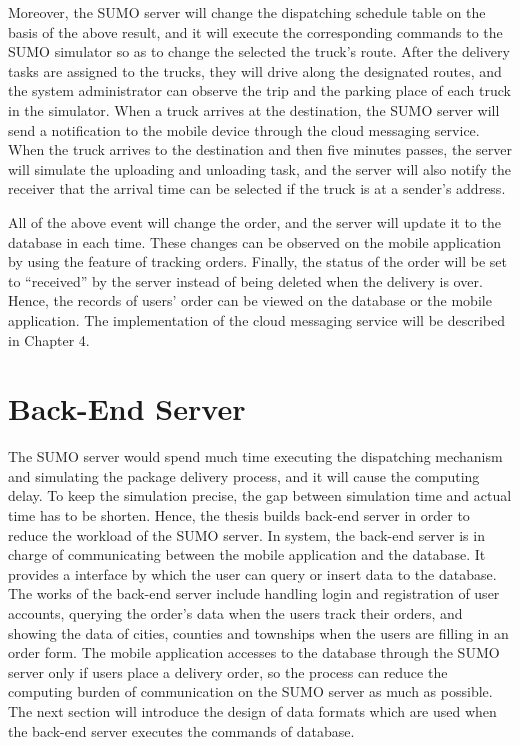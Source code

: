 \documentclass[12pt]{ksthesis}
\begin{document}
\begin{thesis}
{Moreover, the SUMO server will change the dispatching schedule table on the basis of the above result, and it will execute the corresponding commands to the SUMO simulator so as to change the selected the truck’s route.
After the delivery tasks are assigned to the trucks, they will drive along the designated routes, and the system administrator can observe the trip and the parking place of each truck in the simulator. When a truck arrives at the destination, the SUMO server will send a notification to the mobile device through the cloud messaging service. 
When the truck arrives to the destination and then five minutes passes, the server will simulate the uploading and unloading task, and the server will also notify the receiver that the arrival time can be selected if the truck is at a sender’s address. 

All of the above event will change the order, and the server will update it to the database in each time. These changes can be observed on the mobile application by using the feature of tracking orders. Finally, the status of the order will be set to “received” by the server instead of being deleted when the delivery is over. Hence, the records of users’ order can be viewed on the database or the mobile application. The implementation of the cloud messaging service will be described  in Chapter 4.

\section{Back-End Server}
The SUMO server would spend much time executing the dispatching mechanism and simulating the package delivery process, and it will cause the computing delay. To keep the simulation precise, the gap between simulation time and actual time has to be shorten. Hence, the thesis builds back-end server in order to reduce the workload of the SUMO server. In system, the back-end server is in charge of communicating between the mobile application and the database. It provides a interface by which the user can query or insert data to the database. The works of the back-end server include handling login and registration of user accounts, querying the order's data when the users track their orders, and showing the data of cities, counties and townships when the users are filling in an order form. 
The mobile application accesses to the database through the SUMO server only if users place a delivery order, so the process can reduce the computing burden of communication on the SUMO server as much as possible. The next section will introduce the design of data formats which are used when the back-end server executes the commands of database.




}
\end{thesis}
\end{document}
